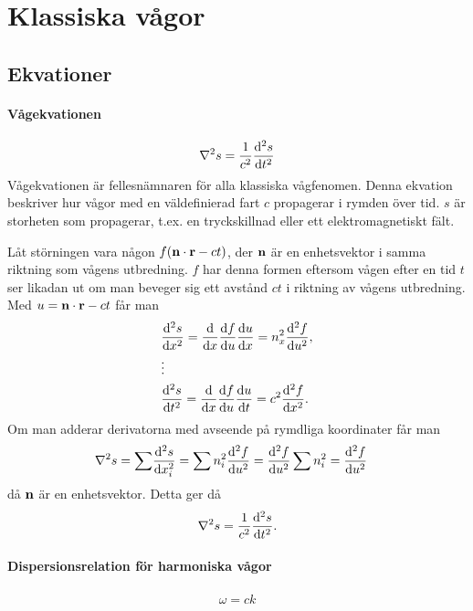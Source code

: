 \section{Klassiska vågor}

\subsection{Ekvationer}

\paragraph{Vågekvationen}
\begin{align*}
	\laplacian{s} = \frac{1}{c^2}\dv[2]{s}{t}
\end{align*}
Vågekvationen är fellesnämnaren för alla klassiska vågfenomen. Denna ekvation beskriver hur vågor med en väldefinierad fart $c$ propagerar i rymden över tid. $s$ är storheten som propagerar, t.ex. en tryckskillnad eller ett elektromagnetiskt fält.

\deriv
Låt störningen vara någon $f(\vect{n}\cdot\vect{r} - ct)$, der $\vect{n}$ är en enhetsvektor i samma riktning som vågens utbredning. $f$ har denna formen eftersom vågen efter en tid $t$ ser likadan ut om man beveger sig ett avstånd $ct$ i riktning av vågens utbredning. Med $u = \vect{n}\cdot\vect{r} - ct$ får man
\begin{align*}
	&\dv[2]{s}{x} = \dv{}{x}\dv{f}{u}\dv{u}{x} = n_x^2\dv[2]{f}{u}, \\
	&\vdots \\
	&\dv[2]{s}{t} = \dv{}{x}\dv{f}{u}\dv{u}{t} = c^2\dv[2]{f}{x}.
\end{align*}
Om man adderar derivatorna med avseende på rymdliga koordinater får man
\begin{align*}
	\laplacian{s} = \sum &\dv[2]{s}{x_i} = \sum n_i^2\dv[2]{f}{u} = \dv[2]{f}{u}\sum n_i^2 = \dv[2]{f}{u}
\end{align*}
då $\vect{n}$ är en enhetsvektor. Detta ger då
\begin{align*}
	\laplacian{s} = \frac{1}{c^2}\dv[2]{s}{t}.
\end{align*}

\paragraph{Dispersionsrelation för harmoniska vågor}
\begin{align*}
	\omega = ck
\end{align*}

